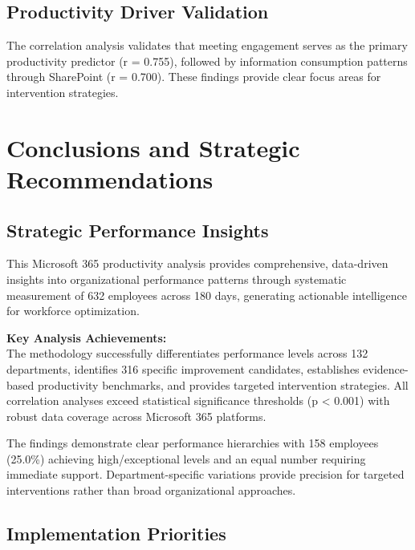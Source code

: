 \documentclass[12pt,a4paper]{article}
\begin{document}
\subsection{Productivity Driver Validation}

The correlation analysis validates that meeting engagement serves as the primary productivity predictor (r = 0.755), followed by information consumption patterns through SharePoint (r = 0.700). These findings provide clear focus areas for intervention strategies.

\section{Conclusions and Strategic Recommendations}

\subsection{Strategic Performance Insights}

This Microsoft 365 productivity analysis provides comprehensive, data-driven insights into organizational performance patterns through systematic measurement of 632 employees across 180 days, generating actionable intelligence for workforce optimization.

\begin{highlightbox}
\textbf{\faCheckCircle \quad Key Analysis Achievements:}\\[0.5em]
The methodology successfully differentiates performance levels across 132 departments, identifies 316 specific improvement candidates, establishes evidence-based productivity benchmarks, and provides targeted intervention strategies. All correlation analyses exceed statistical significance thresholds (p < 0.001) with robust data coverage across Microsoft 365 platforms.
\end{highlightbox}

The findings demonstrate clear performance hierarchies with 158 employees (25.0\%) achieving high/exceptional levels and an equal number requiring immediate support. Department-specific variations provide precision for targeted interventions rather than broad organizational approaches.

\subsection{Implementation Priorities}
\end{document}
